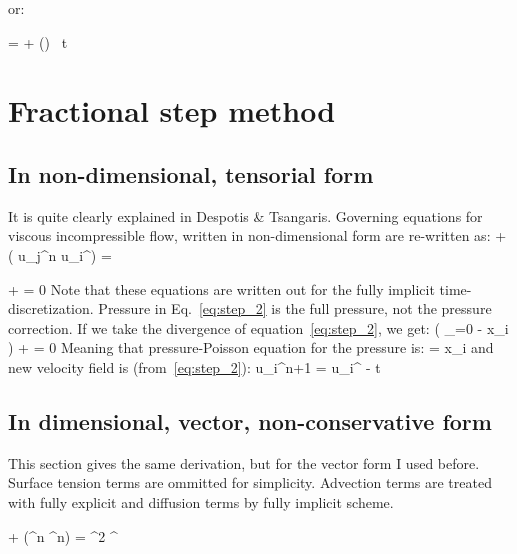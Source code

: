 \documentclass{report}
\begin{document}
or:

\be
  \uvw = \uvw + \nabla () \, \Delta t
\ee

\section{Fractional step method}

\subsection{In non-dimensional, tensorial form}

It is quite clearly explained in Despotis \& Tsangaris. Governing equations for 
viscous incompressible flow, written in non-dimensional form are re-written as:
%
\be
  + 
   \left( u_j^n u_i^\s \right)
  =
   
\ee

\be
  + 
  =
  0
  \label{eq:step_2}
\ee
%
Note that these equations are written out for the fully implicit 
time-discretization. Pressure in Eq.~\ref{eq:step_2} is the full pressure,
not the pressure correction. 
If we take the divergence of equation~\ref{eq:step_2}, we get:
%
\be
    \left( 
      _{=0} 
                   -    {\p x_i} 
    \right) 
  + 
  =
  0
  \label{eq:step_3}
\ee
%
Meaning that pressure-Poisson equation for the pressure is:
%
\be
  =
       {\p x_i} 
  \label{eq:step_4}
\ee
%
and new velocity field is (from~\ref{eq:step_2}):
%
\be
  u_i^{n+1} 
  =
  u_i^\s 
  - 
  \Delta t 
  \label{eq:step_5}
\ee
%

\subsection{In dimensional, vector, non-conservative form}

This section gives the same derivation, but for the vector form I used before.
Surface tension terms are ommitted for simplicity. Advection terms are 
treated with fully explicit and diffusion terms by fully implicit scheme.

\be
  + \nabla (\uvw^n \uvw^n)
  =
  \nu \nabla^2 \uvw^\s
  \; \; \; \; [ \frac{m}{s^2} ]
\ee
\end{document}
